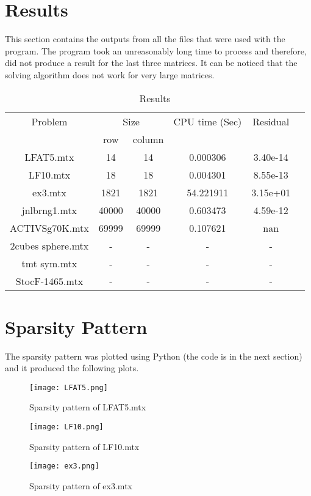 \documentclass[12pt]{article}
\begin{document}
\section{Results}
This section contains the outputs from all the files that were used with the program. The program took an unreasonably long time to process and therefore, did not produce a result for the last three matrices. It can be noticed that the solving algorithm does not work for very large matrices.
\begin{table}[H]
    \caption{Results}
    \label{table:1}
    \centering
    \begin{tabular}{c c c c cl}
        \hline
        Problem& \multicolumn{2}{c}{Size} & CPU time (Sec)  &Residual\\
        & row& column& \\
        \hline
        LFAT5.mtx&14&14&0.000306&3.40e-14&\\
        LF10.mtx&18&18&0.004301&8.55e-13&\\
        ex3.mtx&1821&1821&54.221911&3.15e+01&\\
        jnlbrng1.mtx&40000&40000&0.603473&4.59e-12&\\
        ACTIVSg70K.mtx&69999&69999&0.107621&nan&\\
        2cubes sphere.mtx&-&-&-&-&\\
        tmt sym.mtx&-&-&-&-&\\
        StocF-1465.mtx&-&-&-&-&\\
        \hline
    \end{tabular}
\end{table}

\section{Sparsity Pattern}
The sparsity pattern was plotted using Python (the code is in the next section) and it produced the following plots. 
\begin{figure}[H]
    \centering
    \texttt{[image: LFAT5.png]}
    \caption{Sparsity pattern of LFAT5$.$mtx}
    \label{fig:enter-label}
\end{figure}

\begin{figure}[H]
    \centering
    \texttt{[image: LF10.png]}
    \caption{Sparsity pattern of LF10$.$mtx}
    \label{fig:enter-label}
\end{figure}

\begin{figure}[H]
    \centering
    \texttt{[image: ex3.png]}
    \caption{Sparsity pattern of ex3$.$mtx}
    \label{fig:enter-label}
\end{figure}
\end{document}
